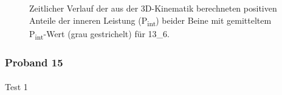 \documentclass[
  letterpaper,
  DIV=11]{scrartcl}
\makeatletter
\let\oldparagraph\paragraph
\renewcommand{\paragraph}{
    \@ifstar
      \xxxParagraphStar
      \xxxParagraphNoStar
  }
\newcommand{\xxxParagraphStar}[1]{\oldparagraph*{#1}\mbox{}}
\newcommand{\xxxParagraphNoStar}[1]{\oldparagraph{#1}\mbox{}}
\makeatother
\begin{document}
\begin{figure}


\caption{\label{fig-PInt_Kinematik_13_6}Zeitlicher Verlauf der aus der
3D-Kinematik berechneten positiven Anteile der inneren Leistung
(P\textsubscript{int}) beider Beine mit gemitteltem
P\textsubscript{int}-Wert (grau gestrichelt) für 13\_6.}

\end{figure}%

\subsubsection{Proband 15}

\paragraph{Test 1}
\end{document}

